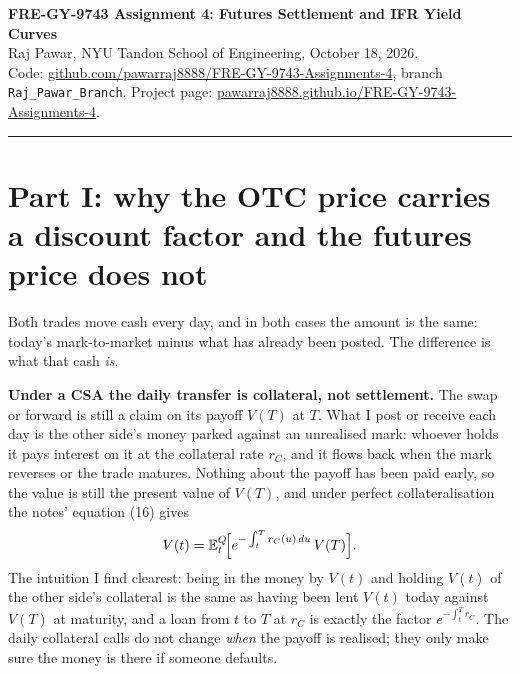 \documentclass[10pt]{article}
\newcommand{\code}[1]{\texttt{#1}}
\newcommand{\E}{\mathbb{E}}
\begin{document}
{\Large\bfseries FRE-GY-9743 Assignment 4: Futures Settlement and IFR Yield Curves}\\[1pt]
Raj Pawar, NYU Tandon School of Engineering, October 18, 2026.\\
Code: \href{https://github.com/pawarraj8888/FRE-GY-9743-Assignments-4/tree/Raj_Pawar_Branch}{github.com/pawarraj8888/FRE-GY-9743-Assignments-4}, branch \code{Raj\_Pawar\_Branch}.
Project page: \href{https://pawarraj8888.github.io/FRE-GY-9743-Assignments-4/}{pawarraj8888.github.io/FRE-GY-9743-Assignments-4}.
\vspace{2pt}\hrule

\section*{Part I: why the OTC price carries a discount factor and the futures price does not}
Both trades move cash every day, and in both cases the amount is the same: today's mark-to-market minus what has already been
posted. The difference is what that cash \emph{is}.

\textbf{Under a CSA the daily transfer is collateral, not settlement.} The swap or forward is still a claim on its payoff $V(T)$ at $T$.
What I post or receive each day is the other side's money parked against an unrealised mark: whoever holds it pays interest on it at
the collateral rate $r_C$, and it flows back when the mark reverses or the trade matures. Nothing about the payoff has been paid early,
so the value is still the present value of $V(T)$, and under perfect collateralisation the notes' equation (16) gives
\[
V(t) = \E^{Q}_t\!\Bigl[e^{-\int_t^T r_C(u)\,du}\,V(T)\Bigr].
\]
The intuition I find clearest: being in the money by $V(t)$ and holding $V(t)$ of the other side's collateral is the same as having been
lent $V(t)$ today against $V(T)$ at maturity, and a loan from $t$ to $T$ at $r_C$ is exactly the factor $e^{-\int_t^T r_C}$. The daily
collateral calls do not change \emph{when} the payoff is realised; they only make sure the money is there if someone defaults.
\end{document}
